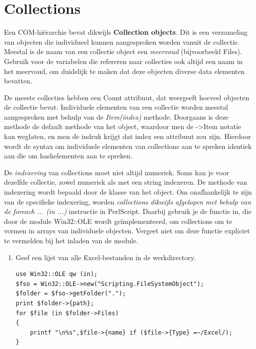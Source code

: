 \documentclass[11pt,a4paper]{report}
\begin{document}
\section{Collections}
Een COM-hiërarchie bevat dikwijls \textbf{Collection objects}. Dit is een verzameling van objecten die individueel kunnen aangesproken worden vanuit de collectie. Meestal is de naam van een collectie object een \textit{meervoud} (bijvoorbeeld Files). Gebruik voor de variabelen die refereren naar collecties ook altijd een naam in het meervoud, om duidelijk te maken dat deze objecten diverse data elementen bevatten. 
\par De meeste collecties hebben een Count attribuut, dat weergeeft hoeveel objecten de collectie bevat. Individuele elementen van een collectie worden meestal aangesproken met behulp van de \textit{Item(index)} methode. Doorgaans is deze methode de default methode van het object, waardoor men de ->Item notatie kan weglaten, en men de indruk krijgt dat index een attribuut zou zijn. Hierdoor wordt de syntax om individuele elementen van collections aan te spreken identiek aan die om hashelementen aan te spreken.
\par De \textit{indexering} van collections moet niet altijd numeriek. Soms kan je voor dezelfde collectie, zowel numeriek als met een string indexeren. De methode van indexering wordt bepaald door de klasse van het object. Om onafhankelijk te zijn van de specifieke indexering, worden \textit{collections dikwijls afgelopen met behulp van de foreach ... (in ...)} instructie in PerlScript. Daarbij gebruik je de functie in, die door de module Win32::OLE wordt geïmplementeerd, om collections om te vormen in arrays van individuele objecten. Vergeet niet om deze functie expliciet te vermelden bij het inladen van de module.
\newpage
\begin{enumerate}[resume]
	\item Geef een lijst van alle Excel-bestanden in de werkdirectory.
\begin{lstlisting}
use Win32::OLE qw (in);
$fso = Win32::OLE->new("Scripting.FileSystemObject");
$folder = $fso->getFolder(".");
print $folder->{path};
for $file (in $folder->Files)
{
	printf "\n%s",$file->{name} if ($file->{Type} =~/Excel/);
}
\end{lstlisting}
\end{enumerate}
\end{document}
